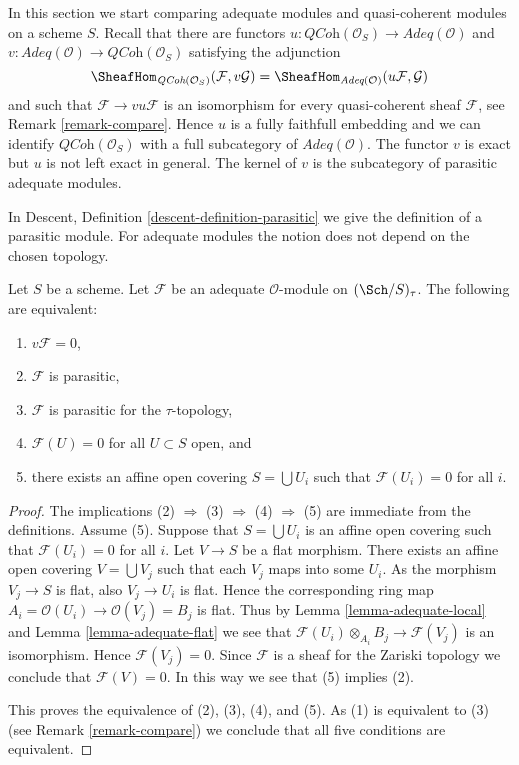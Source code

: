 \noindent
In this section we start comparing adequate modules and quasi-coherent
modules on a scheme $S$. Recall that there are functors
$u : \textit{QCoh}(\mathcal{O}_S) \to \textit{Adeq}(\mathcal{O})$
and
$v : \textit{Adeq}(\mathcal{O}) \to \textit{QCoh}(\mathcal{O}_S)$
satisfying the adjunction
$$
\SheafHom_{\textit{QCoh}(\mathcal{O}_S)}(\mathcal{F}, v\mathcal{G})
=
\SheafHom_{\textit{Adeq}(\mathcal{O})}(u\mathcal{F}, \mathcal{G})
$$
and such that $\mathcal{F} \to vu\mathcal{F}$ is an isomorphism for
every quasi-coherent sheaf $\mathcal{F}$, see
Remark \ref{remark-compare}.
Hence $u$ is a fully faithfull embedding and we can identify
$\textit{QCoh}(\mathcal{O}_S)$ with a full subcategory of
$\textit{Adeq}(\mathcal{O})$.
The functor $v$ is exact but $u$ is not left exact in general.
The kernel of $v$ is the subcategory of parasitic adequate modules.

\medskip\noindent
In Descent, Definition \ref{descent-definition-parasitic}
we give the definition of a parasitic module.
For adequate modules the notion does not depend
on the chosen topology.

\begin{lemma}
\label{lemma-parasitic-adequate}
Let $S$ be a scheme.
Let $\mathcal{F}$ be an adequate $\mathcal{O}$-module on
$(\Sch/S)_\tau$. The following are equivalent:
\begin{enumerate}
\item $v\mathcal{F} = 0$,
\item $\mathcal{F}$ is parasitic,
\item $\mathcal{F}$ is parasitic for the $\tau$-topology,
\item $\mathcal{F}(U) = 0$ for all $U \subset S$ open, and
\item there exists an affine open covering $S = \bigcup U_i$
such that $\mathcal{F}(U_i) = 0$ for all $i$.
\end{enumerate}
\end{lemma}

\begin{proof}
The implications (2) $\Rightarrow$ (3) $\Rightarrow$ (4) $\Rightarrow$ (5)
are immediate from the definitions. Assume (5). Suppose that
$S = \bigcup U_i$ is an affine open covering such that $\mathcal{F}(U_i) = 0$
for all $i$. Let $V \to S$ be a flat morphism. There exists an affine
open covering $V = \bigcup V_j$ such that each $V_j$ maps into some
$U_i$. As the morphism $V_j \to S$ is flat, also $V_j \to U_i$ is flat. 
Hence the corresponding ring map
$A_i = \mathcal{O}(U_i) \to \mathcal{O}(V_j) = B_j$ is flat. Thus by
Lemma \ref{lemma-adequate-local}
and
Lemma \ref{lemma-adequate-flat}
we see that $\mathcal{F}(U_i) \otimes_{A_i} B_j \to \mathcal{F}(V_j)$
is an isomorphism. Hence $\mathcal{F}(V_j) = 0$. Since $\mathcal{F}$ is
a sheaf for the Zariski topology we conclude that $\mathcal{F}(V) = 0$.
In this way we see that (5) implies (2).

\medskip\noindent
This proves the equivalence of (2), (3), (4), and (5).
As (1) is equivalent to (3) (see
Remark \ref{remark-compare})
we conclude that all five conditions are equivalent.
\end{proof}

